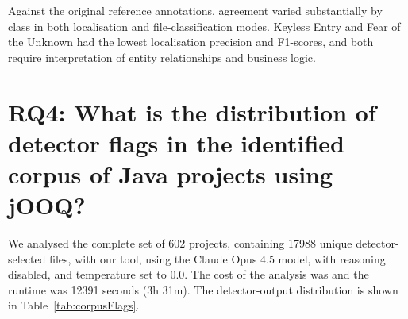 Against the original reference annotations, agreement varied substantially by class in both localisation and file-classification modes. Keyless Entry and Fear of the Unknown had the lowest localisation precision and F1-scores, and both require interpretation of entity relationships and business logic.

\section{RQ4: What is the distribution of detector flags in the identified corpus of Java projects using jOOQ?}\label{sec:resultsRQ4}

We analysed the complete set of \num{602} projects, containing \num{17988} unique detector-selected files, with our tool, using the Claude Opus 4.5 model, with reasoning disabled, and temperature set to \num{0.0}. The cost of the analysis was  and the runtime was \num{12391} seconds (\num{3}h \num{31}m). The detector-output distribution is shown in Table~\ref{tab:corpusFlags}.

